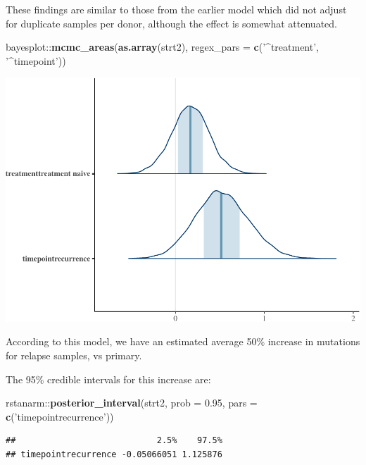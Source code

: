 \documentclass[]{article}
\newenvironment{Shaded}{\begin{snugshade}}{\end{snugshade}}
\newcommand{\KeywordTok}[1]{\textcolor[rgb]{0.13,0.29,0.53}{\textbf{{#1}}}}
\newcommand{\DataTypeTok}[1]{\textcolor[rgb]{0.13,0.29,0.53}{{#1}}}
\newcommand{\FloatTok}[1]{\textcolor[rgb]{0.00,0.00,0.81}{{#1}}}
\newcommand{\StringTok}[1]{\textcolor[rgb]{0.31,0.60,0.02}{{#1}}}
\newcommand{\NormalTok}[1]{{#1}}
\begin{document}
These findings are similar to those from the earlier model which did not
adjust for duplicate samples per donor, although the effect is somewhat
attenuated.

\begin{Shaded}
\begin{Highlighting}[]
\NormalTok{bayesplot::}\KeywordTok{mcmc_areas}\NormalTok{(}\KeywordTok{as.array}\NormalTok{(strt2), }\DataTypeTok{regex_pars =} \KeywordTok{c}\NormalTok{(}\StringTok{'^treatment'}\NormalTok{, }\StringTok{'^timepoint'}\NormalTok{))}
\end{Highlighting}
\end{Shaded}

\includegraphics{Hierarchical_model_mutations_and_peptides_files/figure-latex/allsolid-strt2-coef-plot-1.pdf}

According to this model, we have an estimated average 50\% increase in
mutations for relapse samples, vs primary.

The 95\% credible intervals for this increase are:

\begin{Shaded}
\begin{Highlighting}[]
\NormalTok{rstanarm::}\KeywordTok{posterior_interval}\NormalTok{(strt2, }\DataTypeTok{prob =} \FloatTok{0.95}\NormalTok{, }\DataTypeTok{pars =} \KeywordTok{c}\NormalTok{(}\StringTok{'timepointrecurrence'}\NormalTok{))}
\end{Highlighting}
\end{Shaded}

\begin{verbatim}
##                            2.5%    97.5%
## timepointrecurrence -0.05066051 1.125876
\end{verbatim}
\end{document}
